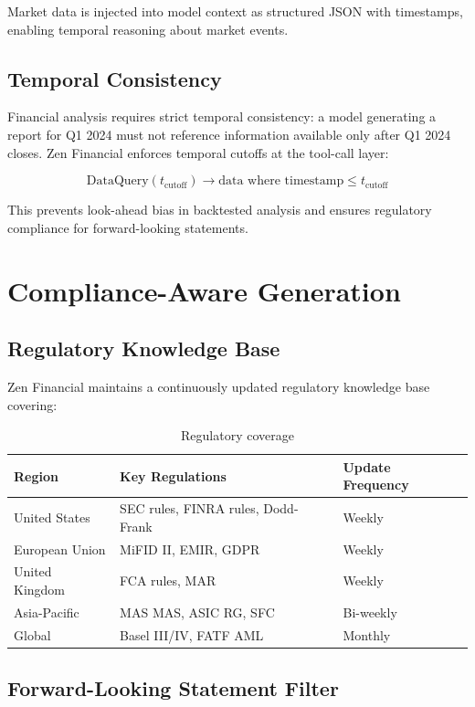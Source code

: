\documentclass[11pt,a4paper]{article}
\begin{document}
Market data is injected into model context as structured JSON with timestamps, enabling temporal reasoning about market events.

\subsection{Temporal Consistency}

Financial analysis requires strict temporal consistency: a model generating a report for Q1 2024 must not reference information available only after Q1 2024 closes. Zen Financial enforces temporal cutoffs at the tool-call layer:

\begin{equation}
\text{DataQuery}(t_{\text{cutoff}}) \to \text{data where } \text{timestamp} \leq t_{\text{cutoff}}
\end{equation}

This prevents look-ahead bias in backtested analysis and ensures regulatory compliance for forward-looking statements.

\section{Compliance-Aware Generation}

\subsection{Regulatory Knowledge Base}

Zen Financial maintains a continuously updated regulatory knowledge base covering:

\begin{table}[H]
\centering
\caption{Regulatory coverage}
\label{tab:regulatory}
\begin{tabular}{lll}
\toprule
Region & Key Regulations & Update Frequency \\
\midrule
United States & SEC rules, FINRA rules, Dodd-Frank & Weekly \\
European Union & MiFID II, EMIR, GDPR & Weekly \\
United Kingdom & FCA rules, MAR & Weekly \\
Asia-Pacific & MAS MAS, ASIC RG, SFC & Bi-weekly \\
Global & Basel III/IV, FATF AML & Monthly \\
\bottomrule
\end{tabular}
\end{table}

\subsection{Forward-Looking Statement Filter}
\end{document}
